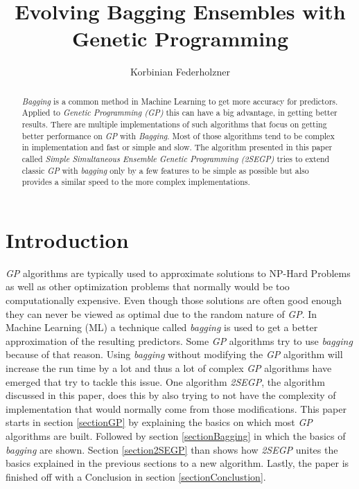 \documentclass[tikz, runningheads]{llncs}
\begin{document}
%
\title{Evolving Bagging Ensembles with Genetic Programming}
%
%
\author{Korbinian Federholzner}
%

%

%
\maketitle              %
%
\begin{abstract}
\textit{Bagging} is a common method in Machine Learning to get more accuracy for predictors. Applied to \textit{Genetic Programming (GP)} 
this can have a big advantage, in getting better results. There are multiple implementations of such algorithms that focus on getting better performance on 
\textit{GP} with \textit{Bagging}. Most of those algorithms tend to be complex in implementation and fast or simple and slow.
The algorithm presented in this paper called \textit{Simple Simultaneous Ensemble Genetic Programming (2SEGP)} tries to extend classic \textit{GP} with \textit{bagging} only by a few features to 
be simple as possible but also provides a similar speed to the more complex implementations. 

\end{abstract}
%
%
%
\section{Introduction}
\textit{GP} algorithms are typically used to approximate solutions to NP-Hard Problems as well as 
other optimization problems that normally would be too computationally expensive. 
Even though those solutions are often good enough they can never be viewed as optimal due to the random 
nature of \textit{GP}. In Machine Learning (ML) a technique called \textit{bagging} is used to get a better approximation of the 
resulting predictors. Some \textit{GP} algorithms try to use \textit{bagging} because of that reason. Using \textit{bagging} without modifying 
the \textit{GP} algorithm will increase the run time by a lot and thus a lot of complex \textit{GP} algorithms have emerged that 
try to tackle this issue. One algorithm \textit{2SEGP}, the algorithm discussed in this paper, does this by also trying to not have the 
complexity of implementation that would normally come from those modifications. This paper starts in section \ref{sectionGP} 
by explaining the basics on which most \textit{GP} algorithms are built. Followed by section \ref{sectionBagging} in which 
the basics of \textit{bagging} are shown. Section \ref{section2SEGP} than shows how \textit{2SEGP} unites the basics explained 
in the previous sections to a new algorithm. Lastly, the paper is finished off with a Conclusion in section 
\ref{sectionConclustion}.
\end{document}
